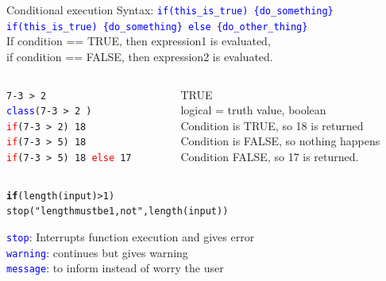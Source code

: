\documentclass[xcolor=table,      handout ,    xcolor=dvipsnames]{beamer}\usepackage[]{graphicx}\usepackage[]{color}
\makeatletter
\newcommand{\hlnum}[1]{\textcolor[rgb]{0,0,0}{#1}}
\newcommand{\hlstr}[1]{\textcolor[rgb]{0.545,0.137,0.137}{#1}}
\newcommand{\hlopt}[1]{\textcolor[rgb]{0,0,0}{#1}}
\newcommand{\hlstd}[1]{\textcolor[rgb]{0,0,0}{#1}}
\newcommand{\hlkwa}[1]{\textcolor[rgb]{1,0,0}{\textbf{#1}}}
\newcommand{\hlkwd}[1]{\textcolor[rgb]{0,0,1}{#1}}
\newenvironment{kframe}{%
 \def\at@end@of@kframe{}%
 \ifinner\ifhmode%
  \def\at@end@of@kframe{\end{minipage}}%
  \begin{minipage}{\columnwidth}%
 \fi\fi%
 \def\FrameCommand##1{\hskip\@totalleftmargin \hskip-\fboxsep
 \colorbox{shadecolor}{##1}\hskip-\fboxsep
     \hskip-\linewidth \hskip-\@totalleftmargin \hskip\columnwidth}%
 \MakeFramed {\advance\hsize-\width
   \@totalleftmargin\z@ \linewidth\hsize
   \@setminipage}}%
 {\par\unskip\endMakeFramed%
 \at@end@of@kframe}
\newenvironment{knitrout}{}{} %
\newcommand{\rcode}[1]{\texttt{\textcolor{Blue}{#1}}}
\makeatother
\begin{document}
\begin{frame}[fragile]{Conditional execution}
Syntax:
\rcode{\alert{if}(this\_is\_true) \{do\_something\}}\\
\pause
\rcode{\alert{if}(this\_is\_true) \{do\_something\} \alert{else} \{do\_other\_thing\}}\\[0.8em]
\pause
If condition == TRUE, then expression1 is evaluated,\\
if condition == FALSE, then expression2 is evaluated.\\[0.8em]
\pause
\begin{columns}
\begin{column}{.40\textwidth}
\texttt{7-3 > 2 \\
\textcolor{blue}{class}(7-3 > 2 ) \\
\textcolor{red}{if}(7-3 > 2) 18  \\
\textcolor{red}{if}(7-3 > 5) 18  \\
\textcolor{red}{if}(7-3 > 5) 18 \textcolor{red}{else} 17 }
\end{column}
\begin{column}{.59\textwidth}
\pause TRUE\\
\pause logical = truth value, boolean\\
\pause Condition is TRUE, so 18 is returned\\
\pause Condition is FALSE, so nothing happens\\
\pause Condition FALSE, so 17 is returned.
\end{column}
\end{columns}
\pause \vspace{0.8em}
\begin{knitrout}
\color{fgcolor}\begin{kframe}
\begin{alltt}
\hlkwa{if}\hlstd{(}\hlkwd{length}\hlstd{(input)}\hlopt{>}\hlnum{1}\hlstd{)}
  \hlkwd{stop}\hlstd{(}\hlstr{"length must be 1, not "}\hlstd{,} \hlkwd{length}\hlstd{(input))}
\end{alltt}
\end{kframe}
\end{knitrout}
\pause \vspace{-0.3em}
\rcode{stop}: Interrupts function execution and gives error\\
\rcode{warning}: continues but gives warning\\
\rcode{message}: to inform instead of worry the user\\[1em]
\end{frame}
\end{document}

